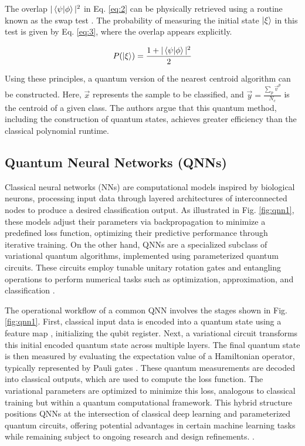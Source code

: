 \documentclass{article}
\begin{document}
The overlap $|\braket{\psi | \phi}|^2$ in Eq. \ref{eq:2} can be physically retrieved using a routine known as the swap test \cite{swaptest}. The probability of measuring the initial state $\ket{\xi}$ in this test is given by Eq. \ref{eq:3}, where the overlap appears explicitly.

\begin{equation}
    P(\ket{\xi}) = \frac{1 + |\braket{\psi | \phi}|^2}{2}
    \label{eq:3}
\end{equation}

Using these principles, a quantum version of the nearest centroid algorithm can be constructed. Here, $\vec{x}$ represents the sample to be classified, and $\vec{y} = \frac{\sum_p \vec{v}^p}{N_c}$ is the centroid of a given class. The authors argue that this quantum method, including the construction of quantum states, achieves greater efficiency than the classical polynomial runtime.

\subsection*{Quantum Neural Networks (QNNs)}
Classical neural networks (NNs) are computational models inspired by biological neurons, processing input data through layered architectures of interconnected nodes to produce a desired classification output. As illustrated in Fig. \ref{fig:qnn1}, these models adjust their parameters via backpropagation to minimize a predefined loss function, optimizing their predictive performance through iterative training. On the other hand, QNNs are a specialized subclass of variational quantum algorithms, implemented using parameterized quantum circuits. These circuits employ tunable unitary rotation gates and entangling operations to perform numerical tasks such as optimization, approximation, and classification \cite{kwak2021quantumneuralnetworksconcepts}.

The operational workflow of a common QNN involves the stages shown in Fig. \ref{fig:qnn1}. First, classical input data is encoded into a quantum state using a feature map \cite{kwon2024featuremapquantumdata}, initializing the qubit register. Next, a variational circuit transforms this initial encoded quantum state across multiple layers. The final quantum state is then measured by evaluating the expectation value of a Hamiltonian operator, typically represented by Pauli gates \cite{farhi2018classificationquantumneuralnetworks}. These quantum measurements are decoded into classical outputs, which are used to compute the loss function. The variational parameters are optimized to minimize this loss, analogous to classical training but within a quantum computational framework. This hybrid structure positions QNNs at the intersection of classical deep learning and parameterized quantum circuits, offering potential advantages in certain machine learning tasks while remaining subject to ongoing research and design refinements. \cite{qiskittheory}.
\end{document}
